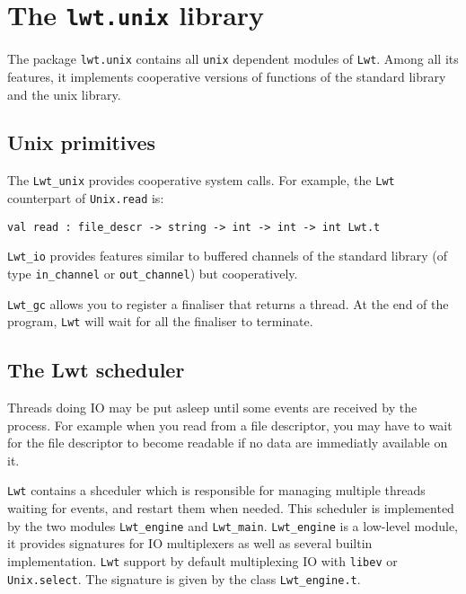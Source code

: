 \section{ The {\tt lwt.unix} library }

The package {\tt lwt.unix} contains all {\tt unix} dependent
modules of {\tt Lwt}. Among all its features, it implements cooperative
versions of functions of the standard library and the unix library.



\subsection{ Unix primitives }

The {\tt Lwt\_unix} provides cooperative system calls. For example,
the {\tt Lwt} counterpart of {\tt Unix.read} is:



\lstset{language=[Objective]Caml}\begin{lstlisting}
val read : file_descr -> string -> int -> int -> int Lwt.t
\end{lstlisting}
\medskip

\noindent
{\tt Lwt\_io} provides features similar to buffered channels of
the standard library (of type {\tt in\_channel} or
{\tt out\_channel}) but cooperatively.



{\tt Lwt\_gc} allows you to register a finaliser that returns a
thread. At the end of the program, {\tt Lwt} will wait for all the
finaliser to terminate.



\subsection{ The Lwt scheduler }

Threads doing IO may be put asleep until some events are received by
the process. For example when you read from a file descriptor, you
may have to wait for the file descriptor to become readable if no
data are immediatly available on it.



{\tt Lwt} contains a shceduler which is responsible for managing
multiple threads waiting for events, and restart them when needed.
This scheduler is implemented by the two modules {\tt Lwt\_engine}
and {\tt Lwt\_main}. {\tt Lwt\_engine} is a low-level module, it
provides signatures for IO multiplexers as well as several builtin
implementation. {\tt Lwt} support by default multiplexing IO with
{\tt libev} or {\tt Unix.select}. The signature is given by the
class {\tt Lwt\_engine.t}.



